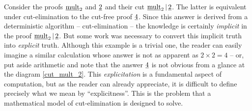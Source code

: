 \documentclass[english,letter paper,12pt,reqno]{article}
\theoremstyle{example}
\numberwithin{equation}{section}
\def\inta{\bold{int}}
\begin{document}
Consider the proofs $\underline{\mathrm{mult}}_2$ and $\underline{2}$ and their cut $\underline{\mathrm{mult}}_2 \,|\, \underline{2}$. The latter is equivalent under cut-elimination to the cut-free proof $\underline{4}$. Since this answer is derived from a deterministic algorithm -- cut-elimination -- the knowledge is certainly \emph{implicit} in the proof $\underline{\mathrm{mult}}_2 \,|\, \underline{2}$. But some work was necessary to convert this implicit truth into \emph{explicit} truth. Although this example is a trivial one, the reader can easily imagine a similar calculation whose answer is not as apparent as $2 \times 2 = 4$ -- or, put aside arithmetic and note that the answer $\underline{4}$ is not obvious from a glance at the diagram \eqref{cut_mult_2}. This \emph{explicitation} is a fundamental aspect of computation, but as the reader can already appreciate, it is difficult to define precisely what we mean by ``explicitness''. This is the problem that a mathematical model of cut-elimination is designed to solve.
\\
\end{document}
